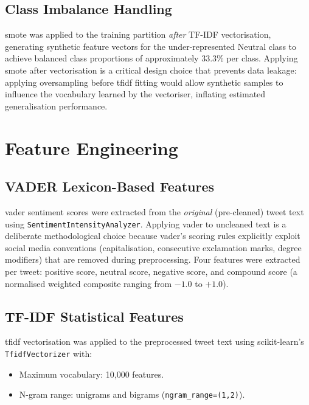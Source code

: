\subsection{Class Imbalance Handling}

\gls{smote} \citep{chawla2002smote} was applied to the training partition \emph{after} TF-IDF vectorisation, generating synthetic feature vectors for the under-represented Neutral class to achieve balanced class proportions of approximately 33.3\% per class. Applying \gls{smote} after vectorisation is a critical design choice that prevents data leakage: applying oversampling before \gls{tfidf} fitting would allow synthetic samples to influence the vocabulary learned by the vectoriser, inflating estimated generalisation performance.

\section{Feature Engineering}

\subsection{VADER Lexicon-Based Features}

\gls{vader} sentiment scores were extracted from the \emph{original} (pre-cleaned) tweet text using \texttt{SentimentIntensityAnalyzer}. Applying \gls{vader} to uncleaned text is a deliberate methodological choice because \gls{vader}'s scoring rules explicitly exploit social media conventions (capitalisation, consecutive exclamation marks, degree modifiers) that are removed during preprocessing. Four features were extracted per tweet: positive score, neutral score, negative score, and compound score (a normalised weighted composite ranging from $-1.0$ to $+1.0$).

\subsection{TF-IDF Statistical Features}

\gls{tfidf} vectorisation was applied to the preprocessed tweet text using scikit-learn's \texttt{TfidfVectorizer} with:
\begin{itemize}
  \item Maximum vocabulary: 10,000 features.
  \item N-gram range: unigrams and bigrams (\texttt{ngram\_range=(1,2)}).
\end{itemize}

